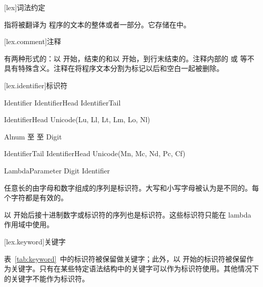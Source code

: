 
[lex]{词法约定}

\pnum
{}指将被翻译为 \X 程序的文本的整体或者一部分。它存储在中。

[lex.comment]{注释}

\pnum
有两种形式的：以\tcode{/*} 开始，\tcode{*/}结束的和以\tcode{//} 开始，到行末结束的。注释内部的 \tcode{/*} 或 \tcode{//} 等不具有特殊含义。注释在将程序文本分割为标记以后和空白一起被删除。

[lex.identifier]{标识符}

\begin{bnf}{Identifier}
    IdentifierHead IdentifierTail\bnfs
\end{bnf}

\begin{bnf}{IdentifierHead}
    Unicode(Lu, Ll, Lt, Lm, Lo, Nl) \br
    \terminal{_}
\end{bnf}

\begin{bnf}{Alnum}
     \textnormal{至}  \br
     \textnormal{至}  \br
    Digit
\end{bnf}

\begin{bnf}{IdentifierTail}
    IdentifierHead \br
    Unicode(Mn, Mc, Nd, Pc, Cf)
\end{bnf}

\begin{bnf}{LambdaParameter}
    \terminal{\$} Digit\bnfp \br
    \terminal{\$} Identifier
\end{bnf}

\pnum
任意长的由字母和数字组成的序列是标识符。大写和小写字母被认为是不同的。每个字符都是有效的。

\pnum
以 \tcode{\$} 开始后接十进制数字或标识符的序列也是标识符。这些标识符只能在 lambda 作用域中使用。

[lex.keyword]{关键字}

\pnum
表~\ref{tab:keyword}~中的标识符被保留做关键字；此外，以 \tcode{\_\_} 开始的标识符被保留作为关键字。只有在某些特定语法结构中的关键字可以作为标识符使用。其他情况下的关键字不能作为标识符。

